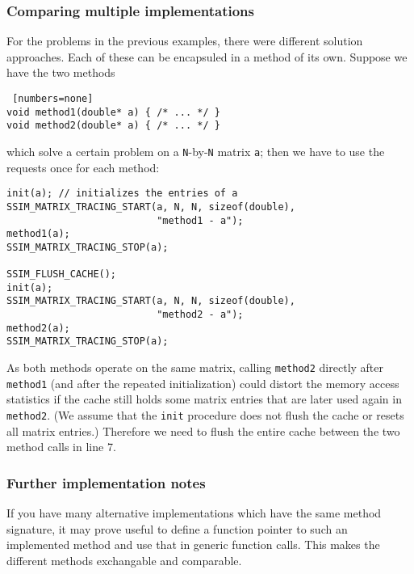 \subsubsection*{Comparing multiple implementations}
For the problems in the previous examples, there were different solution approaches. Each of these can be encapsuled in a method of its own. Suppose we have the two methods
\begin{lstlisting} [numbers=none]
void method1(double* a) { /* ... */ }
void method2(double* a) { /* ... */ }
\end{lstlisting}
which solve a certain problem on a \texttt{N}-by-\texttt{N} matrix \texttt{a}; then we have to use the requests once for each method:
\begin{lstlisting}
init(a); // initializes the entries of a
SSIM_MATRIX_TRACING_START(a, N, N, sizeof(double), 
                          "method1 - a");
method1(a);
SSIM_MATRIX_TRACING_STOP(a);

SSIM_FLUSH_CACHE();
init(a);
SSIM_MATRIX_TRACING_START(a, N, N, sizeof(double), 
                          "method2 - a");
method2(a);
SSIM_MATRIX_TRACING_STOP(a);
\end{lstlisting}
As both methods operate on the same matrix, calling \texttt{method2} directly after \texttt{method1} (and after the repeated initialization) could distort the memory access statistics if the cache still holds some matrix entries that are later used again in \texttt{method2}. (We assume that the \texttt{init} procedure does not flush the cache or resets all matrix entries.) Therefore we need to flush the entire cache between the two method calls in line 7. %

\subsubsection*{Further implementation notes}
If you have many alternative implementations which have the same method signature, it may prove useful to define a function pointer to such an implemented method and use that in generic function calls. This makes the different methods exchangable and comparable.

